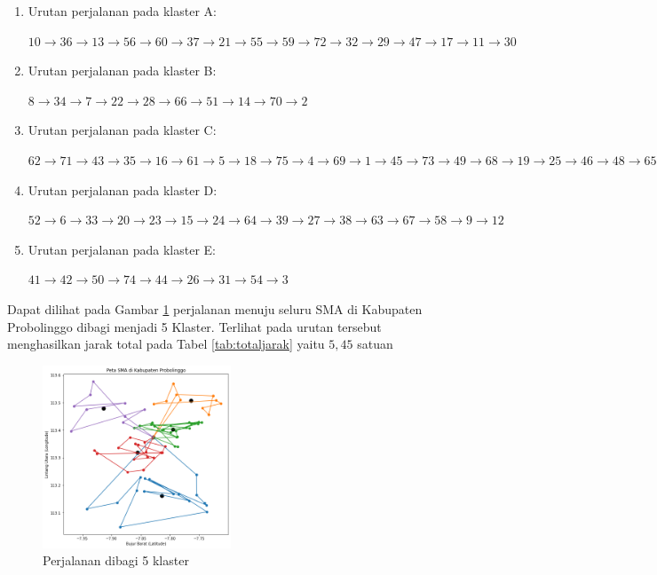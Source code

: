 \begin{enumerate}

\item Urutan perjalanan pada klaster A:

$10\rightarrow36\rightarrow13\rightarrow56\rightarrow60\rightarrow37\rightarrow21\rightarrow55\rightarrow59\rightarrow72\rightarrow32\rightarrow29\rightarrow47\rightarrow17\rightarrow11\rightarrow30$

\item Urutan perjalanan pada klaster B:

$8\rightarrow34\rightarrow7\rightarrow22\rightarrow28\rightarrow66\rightarrow51\rightarrow14\rightarrow70\rightarrow2$

\item Urutan perjalanan pada klaster C:

$62\rightarrow71\rightarrow43\rightarrow35\rightarrow16\rightarrow61\rightarrow5\rightarrow18\rightarrow75\rightarrow4\rightarrow69\rightarrow1\rightarrow45\rightarrow73\rightarrow49\rightarrow68\rightarrow19\rightarrow25\rightarrow46\rightarrow48\rightarrow65\rightarrow40\rightarrow53\rightarrow57$

\item Urutan perjalanan pada klaster D:

$52\rightarrow6\rightarrow33\rightarrow20\rightarrow23\rightarrow15\rightarrow24\rightarrow64\rightarrow39\rightarrow27\rightarrow38\rightarrow63\rightarrow67\rightarrow58\rightarrow9\rightarrow12$

\item Urutan perjalanan pada klaster E:

$41\rightarrow42\rightarrow50\rightarrow74\rightarrow44\rightarrow26\rightarrow31\rightarrow54\rightarrow3$

\end{enumerate}

Dapat dilihat pada Gambar \ref{fig:hasil_mtsp5} perjalanan menuju seluru SMA di Kabupaten Probolinggo dibagi menjadi 5 Klaster. Terlihat pada urutan tersebut menghasilkan jarak total pada Tabel \ref{tab:totaljarak} yaitu $5,45$ satuan

\begin{figure}[H]
\centering
\includegraphics[width=0.5\textwidth]{Gambar/hasil_mtsp/5}
\caption{Perjalanan dibagi 5 klaster}
\label{fig:hasil_mtsp5}
\end{figure}

